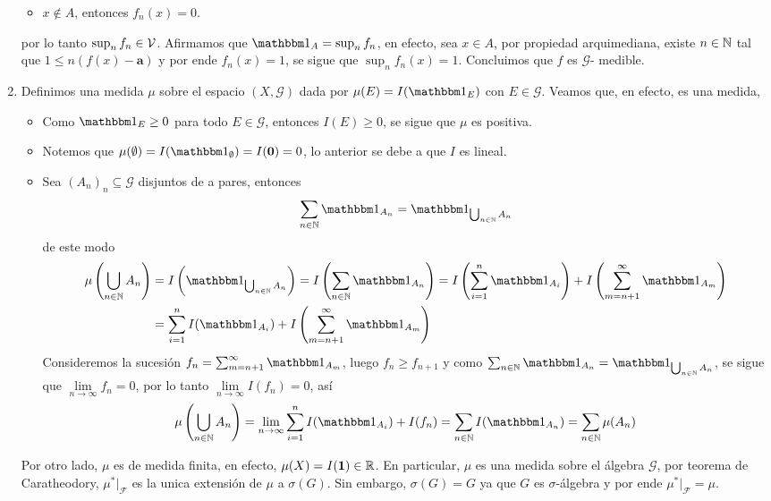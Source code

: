 \documentclass{article}
\begin{document}
\begin{enumerate}
\begin{itemize}
        \item $x\not\in A$, entonces $f_{n}(x)=0$.
    \end{itemize}
    por lo tanto $\sup_{n}f_{n}\in\mathcal{V}$. Afirmamos que $\I_{A}=\sup_{n}f_{n}$, en efecto, sea 
    $x\in A$, por propiedad arquimediana, existe $n\in\mathbb{N}$ tal que $1\leq n(f(x)-\textbf{a})$ y por
    ende $f_{n}(x)=1$, se sigue que $\sup_{n}f_{n}(x)=1$. Concluimos que $f$ es $\mathcal{G}$-
    medible.

    \item Definimos una medida $\mu$ sobre el espacio $(X,\mathcal{G})$ dada por 
    $\mu(E)=I(\I_{E})$ con $E\in\mathcal{G}$. Veamos que, en efecto, es una medida,
    \begin{itemize}
        \item Como $\I_{E}\geq0$ para todo $E\in\mathcal{G}$, entonces $I(E)\geq0$, se sigue que
        $\mu$ es positiva.
        
        \item Notemos que $\mu(\emptyset)=I(\I_{\emptyset})=I(\textbf{0})=0$, lo anterior se debe
        a que $I$ es lineal.

        \item Sea $(A_{n})_{n}\subseteq\mathcal{G}$ disjuntos de a pares, entonces
        \begin{equation*}
            \sum_{n\in\N}\I_{A_{n}}=\I_{\bigcup_{n\in\N}A_{n}}
        \end{equation*}
        de este modo
        \begin{align*}
            \mu\left(\bigcup_{n\in\N}A_{n}\right) &= I\left(\I_{\bigcup_{n\in\N}A_{n}}\right)
            =I\left(\sum_{n\in\N}\I_{A_{n}}\right)=I\left(\sum_{i=1}^{n}\I_{A_{i}}\right)+
            I\left(\sum_{m=n+1}^{\infty}\I_{A_{m}}\right) \\
            &= \sum_{i=1}^{n}I(\I_{A_{i}})+I\left(\sum_{m=n+1}^{\infty}\I_{A_{m}}\right)
        \end{align*}
        Consideremos la sucesión $f_{n}=\sum_{m=n+1}^{\infty}\I_{A_{m}}$, luego $f_{n}\geq f_{n+1}$
        y como $\sum_{n\in\N}\I_{A_{n}}=\I_{\bigcup_{n\in\N}A_{n}}$, se sigue que 
        $\lim\limits_{n\to\infty}f_{n}=0$, por lo tanto $\lim\limits_{n\to\infty}I(f_{n})=0$, así
        \begin{equation*}
            \mu\left(\bigcup_{n\in\N}A_{n}\right)=\lim\limits_{n\to\infty}
            \sum_{i=1}^{n}I(\I_{A_{i}})+I(f_{n})=\sum_{n\in\N}I(\I_{A_{n}})=\sum_{n\in\N}\mu(A_{n})
        \end{equation*}
    \end{itemize}
    Por otro lado, $\mu$ es de medida finita, en efecto, $\mu(X)=I(\textbf{1})\in\mathbb{R}$. En 
    particular, $\mu$ es una medida sobre el álgebra $\mathcal{G}$, por teorema de Caratheodory, 
    $\mu^{*}\big|_{\mathcal{F}}$ es la unica extensión de $\mu$ a $\sigma(G)$. Sin embargo, 
    $\sigma(G)=G$ ya que $G$ es $\sigma$-álgebra y por ende $\mu^{*}\big|_{\mathcal{F}}=\mu$.
    

\end{enumerate}
\end{document}
